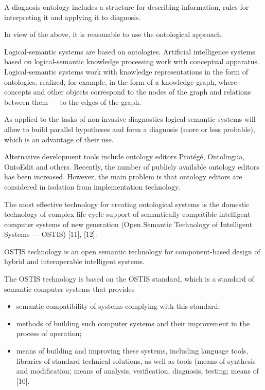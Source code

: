 \documentclass[twocolumn]{scndocument}
\begin{document}
A diagnosis ontology includes a structure for describing information, rules for interpreting it and applying it
to diagnosis.

In view of the above, it is reasonable to use the
ontological approach.

Logical-semantic systems are based on ontologies.
Artificial intelligence systems based on logical-semantic
knowledge processing work with conceptual apparatus.
Logical-semantic systems work with knowledge representations in the form of ontologies, realized, for example, in the form of a knowledge graph, where concepts
and other objects correspond to the nodes of the graph
and relations between them — to the edges of the graph.

As applied to the tasks of non-invasive diagnostics
logical-semantic systems will allow to build parallel
hypotheses and form a diagnosis (more or less probable),
which is an advantage of their use.

Alternative development tools include ontology editors
Protégé, Ontolingua, OntoEdit and others. Recently, the
number of publicly available ontology editors has been
increased. However, the main problem is that ontology
editors are considered in isolation from implementation
technology.

The most effective technology for creating ontological
systems is the domestic technology of complex life cycle support of semantically compatible intelligent computer
systems of new generation (Open Semantic Technology
of Intelligent Systems — OSTIS) [11], [12].

OSTIS technology is an open semantic technology
for component-based design of hybrid and interoperable
intelligent systems.

The OSTIS technology is based on the OSTIS standard, which is a standard of semantic computer systems
that provides

\vspace{-5pt}
\begin{itemize}
    \setlength{\itemsep}{-3pt} 
    \setlength{\parsep}{-3pt}
    \item semantic compatibility of systems complying with
this standard;
    \item methods of building such computer systems and
their improvement in the process of operation;
    \item means of building and improving these systems,
including language tools, libraries of standard technical solutions, as well as tools (means of synthesis
and modification; means of analysis, verification,
diagnosis, testing; means of [10].
\end{itemize}
\vspace{-5pt}
\end{document}
